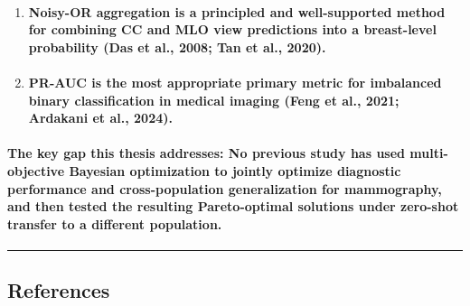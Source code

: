 \begin{enumerate}
  \paragraph{Treating cross-dataset degradation as a formal optimization objective is new in the context of mammography. Existing work either ignores generalization during optimization or measures it after the fact. This thesis treats it as a first-class criterion.}
\item
  \paragraph{Noisy-OR aggregation is a principled and well-supported method for combining CC and MLO view predictions into a breast-level probability (Das et al., 2008; Tan et al., 2020).}
\item
  \paragraph{PR-AUC is the most appropriate primary metric for imbalanced binary classification in medical imaging (Feng et al., 2021; Ardakani et al., 2024).}
\end{enumerate}

\paragraph{The key gap this thesis addresses: No previous study has used multi-objective Bayesian optimization to jointly optimize diagnostic performance and cross-population generalization for mammography, and then tested the resulting Pareto-optimal solutions under zero-shot transfer to a different population.}

\begin{center}\rule{0.5\linewidth}{0.5pt}\end{center}

\subsection{References}\label{references}


